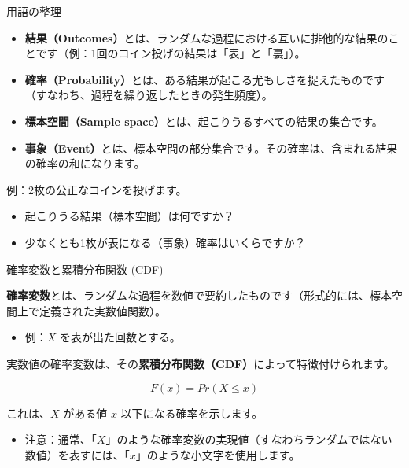 \documentclass[11pt,handout]{beamer}
\newenvironment{wideitemize}{\itemize\addtolength{\itemsep}{10pt}}{\enditemize}
\begin{document}
\begin{frame}{用語の整理}

\begin{itemize}
\item \textbf{結果（Outcomes）}とは、ランダムな過程における互いに排他的な結果のことです（例：1回のコイン投げの結果は「表」と「裏」）。
\vspace{0.1cm}\pause{}
\item \textbf{確率（Probability）}とは、ある結果が起こる尤もしさを捉えたものです（すなわち、過程を繰り返したときの発生頻度）。
\vspace{0.1cm}\pause{}
\item \textbf{標本空間（Sample space）}とは、起こりうるすべての結果の集合です。
\vspace{0.1cm}\pause{}
\item \textbf{事象（Event）}とは、標本空間の部分集合です。その確率は、含まれる結果の確率の和になります。
\end{itemize}
\vspace{0.4cm}
\pause{}
例：2枚の公正なコインを投げます。\pause{}

\begin{itemize}
\item 起こりうる結果（標本空間）は何ですか？
\vspace{0.1cm}\pause{}
\item 少なくとも1枚が表になる（事象）確率はいくらですか？
\end{itemize}

\end{frame}

\begin{frame}{確率変数と累積分布関数 (CDF)}
\begin{wideitemize}
\item
\textbf{確率変数}とは、ランダムな過程を数値で要約したものです（形式的には、標本空間上で定義された実数値関数）。

\begin{itemize}
\item 例：$X$ を表が出た回数とする。
\end{itemize}
\pause{}

\item 実数値の確率変数は、その\textbf{累積分布関数（CDF）}によって特徴付けられます。

$$F(x) = Pr( X \leq x ) $$

\noindent これは、$X$ がある値 $x$ 以下になる確率を示します。
\medskip\pause{}
\begin{itemize}
\item 注意：通常、「$X$」のような確率変数の実現値（すなわちランダムではない数値）を表すには、「$x$」のような小文字を使用します。
\end{itemize}

\end{wideitemize}
\end{frame} 
\end{document}
